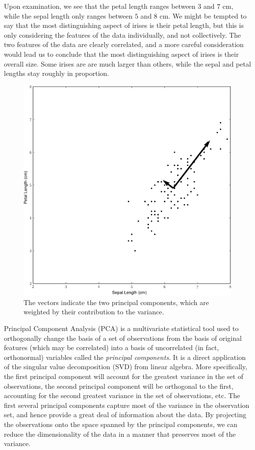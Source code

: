 Upon examination, we see that the petal length ranges between $3$ and $7$ cm, while the sepal length only ranges between $5$ and $8$ cm. We might be tempted to say that the most distinguishing aspect of irises is their petal length, but this is only considering the features of the data individually, and not collectively. The two features of the data are clearly correlated, and a more careful consideration would lead us to conclude that the most distinguishing aspect of irises is their overall size. Some irises are are much larger than others, while the sepal and petal lengths stay roughly in proportion.
\begin{figure}
\includegraphics[width=\textwidth]{iris2.pdf}
\caption{The vectors indicate the two principal components, which are weighted by their contribution to the variance.}
\label{fig:iris_2}
\end{figure}

Principal Component Analysis (PCA) is a multivariate statistical tool used to orthogonally change the basis of a set of observations from the basis of original features (which may be correlated) into a basis of uncorrelated (in fact, orthonormal) variables called the \emph{principal components}. It is a direct application of the singular value decomposition (SVD) from linear algebra. More specifically, the first principal component will account for the greatest variance in the set of observations, the second principal component will be orthogonal to the first, accounting for the second greatest variance in the set of observations, etc. The first several principal components capture most of the variance in the observation set, and hence provide a great deal of information about the data. By projecting the observations onto the space spanned by the principal components, we can reduce the dimensionality of the data in a manner that preserves most of the variance.


